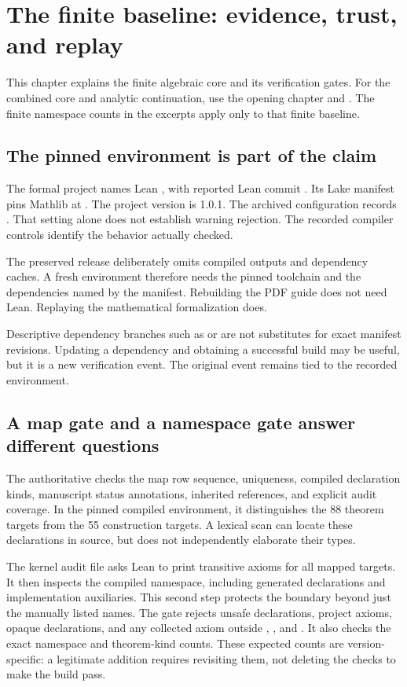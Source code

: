 \clearpage
\section{The finite baseline: evidence, trust, and replay}
This chapter explains the finite algebraic core and its verification gates. For the combined core and analytic continuation, use the opening chapter and . The finite namespace counts in the excerpts apply only to that finite baseline.
\subsection{The pinned environment is part of the claim}
The formal project names Lean , with reported Lean commit . Its Lake manifest pins Mathlib at . The project version is 1.0.1. The archived configuration records . That setting alone does not establish warning rejection. The recorded compiler controls identify the behavior actually checked.

The preserved release deliberately omits compiled outputs and dependency caches. A fresh environment therefore needs the pinned toolchain and the dependencies named by the manifest. Rebuilding the PDF guide does not need Lean. Replaying the mathematical formalization does.

Descriptive dependency branches such as  or  are not substitutes for exact manifest revisions. Updating a dependency and obtaining a successful build may be useful, but it is a new verification event. The original event remains tied to the recorded environment.

\subsection{A map gate and a namespace gate answer different questions}
The authoritative  checks the map row sequence, uniqueness, compiled declaration kinds, manuscript status annotations, inherited references, and explicit audit coverage. In the pinned compiled environment, it distinguishes the 88 theorem targets from the 55 construction targets. A lexical scan can locate these declarations in source, but does not independently elaborate their types.

The kernel audit file asks Lean to print transitive axioms for all mapped targets. It then inspects the compiled  namespace, including generated declarations and implementation auxiliaries. This second step protects the boundary beyond just the manually listed names.
The gate rejects unsafe declarations, project axioms, opaque declarations, and any collected axiom outside , , and . It also checks the exact namespace and theorem-kind counts. These expected counts are version-specific: a legitimate addition requires revisiting them, not deleting the checks to make the build pass.

